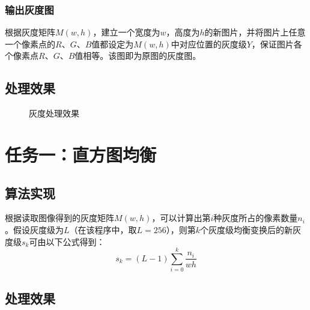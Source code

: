 \documentclass[UTF8]{ctexart}
\begin{document}
			\subsubsection{输出灰度图}
			根据灰度矩阵$M(w,h)$，建立一个宽度为$w$，高度为$h$的新图片，并将图片上任意一个像素点的$R$、$G$、$B$值都设定为$M(w,h)$中对应位置的灰度级$Y$，保证图片各个像素点$R$、$G$、$B$值相等。该图即为原图的灰度图。
		\subsection{处理效果}

		\begin{figure}[H]
		\centering
		\caption{灰度处理效果}
		\end{figure}


	\section{任务一：直方图均衡}
		\subsection{算法实现}
		根据读取图像得到的灰度矩阵$M(w,h)$，可以计算出第$i$种灰度所占的像素数量$n_i$。假设灰度级为$L$（在该程序中，取$L=256$），则第$k$个灰度级均衡变换后的新灰度级$s_k$可由以下公式得到：
		\[ s_k=(L-1)\sum_{i=0}^k\frac{n_i}{wh} \]

		\subsection{处理效果}
\end{document}
